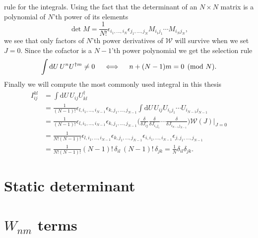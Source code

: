 rule for the integrals. Using the fact that the determinant of an $N \times N$ matrix is a
polynomial of $N$'th power of its elements
%
\begin{equation}
  \det M = \frac{1}{N!} \epsilon_{i_1,\dots,i_N} \epsilon_{j_1, \dots, j_N}
  M_{i_1j_1} \cdots M_{i_Nj_N},
\end{equation}
%
we see that only factors of $N$'th power derivatives of $\mathcal{W}$ will
survive when we set $J=0$. Since the cofactor is a $N-1$'th power polynomial we
get the selection rule
%
\begin{equation} \label{eq-integral-selection-rule}
  \int \mathrm{d} U \, U^n U^{\dagger m} \neq 0  \hskip1em\iff\hskip1em n + (N-1)m = 0 \pmod N.
\end{equation}
%
Finally we will compute the most commonly used integral in this thesis
%
\begin{align}
  I_{ij}^{kl} &= \int \mathrm{d} U \, U_{ij} U^{\dagger}_{kl} \nonumber\\
  &= \frac{1}{(N-1)!} \epsilon_{l,i_1,\dots,i_{N-1}} \epsilon_{k, j_1, \dots, j_{N-1}}
    \int \mathrm{d} U \, U_{ij} U_{i_1j_1} \cdots U_{i_{N-1}j_{N-1}} \nonumber\\
  &= \frac{1}{(N-1)!} \epsilon_{l,i_1,\dots,i_{N-1}} \epsilon_{k, j_1, \dots, j_{N-1}}
    \bigg( \frac{\delta}{\delta J_{ij}} \frac{\delta}{\delta J_{i_1j_1}} \cdots
    \frac{\delta}{\delta J_{i_{N-1}j_{N-1}}} \bigg) \mathcal{W}(J) \bigg|_{J=0}
    \nonumber \\
  &= \frac{1}{N!(N-1)!} \epsilon_{l,i_1,\dots,i_{N-1}} \epsilon_{k, j_1, \dots, j_{N-1}}
  \epsilon_{i,i_1,\dots,i_{N-1}} \epsilon_{j,j_1,\dots,j_{N-1}} \nonumber \\
  &= \frac{1}{N!(N-1)!} (N-1)!\,\delta_{il}\,(N-1)!\,\delta_{jk} = \frac{1}{N}
  \delta_{il} \delta_{jk} .
\end{align}

\section{Static determinant} \label{sec-evaluating-fermion-determinants}
\section{\texorpdfstring{$W_{nm}$}{Wnm} terms}
\label{sec-evaluating-polyakov-coupling-terms}
